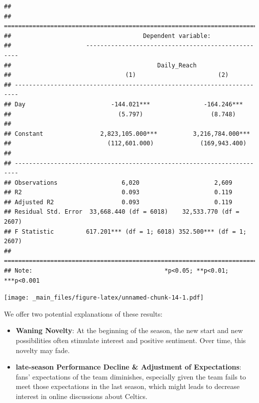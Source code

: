 \documentclass[
]{book}
\newenvironment{Shaded}{\begin{snugshade}}{\end{snugshade}}
\newcommand{\FunctionTok}[1]{\textcolor[rgb]{0.13,0.29,0.53}{\textbf{#1}}}
\newcommand{\NormalTok}[1]{#1}
\newcommand{\SpecialCharTok}[1]{\textcolor[rgb]{0.81,0.36,0.00}{\textbf{#1}}}
\begin{document}
\begin{verbatim}
## 
## =======================================================================
##                                     Dependent variable:                
##                     ---------------------------------------------------
##                                         Daily_Reach                    
##                                (1)                       (2)           
## -----------------------------------------------------------------------
## Day                        -144.021***               -164.246***       
##                              (5.797)                   (8.748)         
##                                                                        
## Constant                2,823,105.000***          3,216,784.000***     
##                           (112,601.000)             (169,943.400)      
##                                                                        
## -----------------------------------------------------------------------
## Observations                  6,020                     2,609          
## R2                            0.093                     0.119          
## Adjusted R2                   0.093                     0.119          
## Residual Std. Error  33,668.440 (df = 6018)    32,533.770 (df = 2607)  
## F Statistic         617.201*** (df = 1; 6018) 352.500*** (df = 1; 2607)
## =======================================================================
## Note:                                     *p<0.05; **p<0.01; ***p<0.001
\end{verbatim}

\begin{Shaded}
\end{Shaded}

\texttt{[image: \_main\_files/figure-latex/unnamed-chunk-14-1.pdf]}

We offer two potential explanations of these results:

\begin{itemize}
\item
  \textbf{Waning Novelty}: At the beginning of the season, the new start and new possibilities often stimulate interest and positive sentiment. Over time, this novelty may fade.
\item
  \textbf{late-season Performance Decline \& Adjustment of Expectations}: fans' expectations of the team diminishes, especially given the team fails to meet those expectations in the last season, which might leads to decrease interest in online discussions about Celtics.
\end{itemize}
\end{document}
